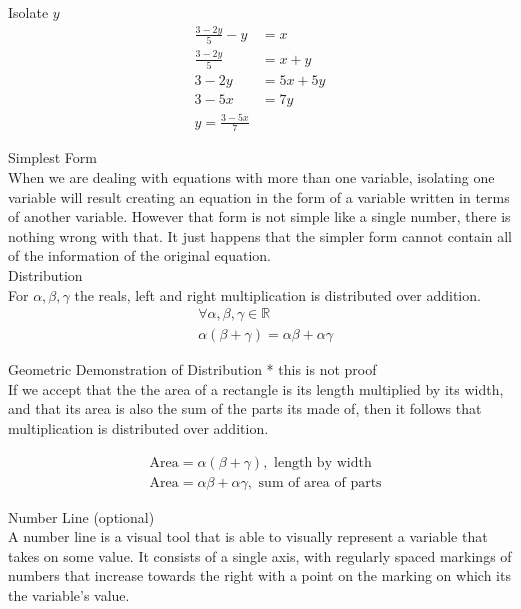 \documentclass{book}
\begin{document}
  {\example Isolate $y$ \\
    \begin{align*}
      \frac{3 - 2y}{5} - y & = x\\
      \frac{3 - 2y}{5} & = x + y\\
      3 - 2y & = 5x + 5y\\
      3 - 5x & = 7y\\
      y = \frac{3 - 5x}{7}
    \end{align*}
  }

  {\remark Simplest Form \\
    When we are dealing with equations with more than one variable, isolating one variable will result creating an equation in the form of a variable written in terms of another variable. However that form is not simple like a single number, there is nothing wrong with that. It just happens that the simpler form cannot contain all of the information of the original equation.
  }\\

  {\axiom Distribution \\
    For $\alpha, \beta, \gamma$ the reals, left and right multiplication is distributed over addition.
    \begin{align*}
      & \forall \alpha, \beta, \gamma \in \mathbb{R}\\
      & \alpha (\beta + \gamma) = \alpha \beta + \alpha \gamma
    \end{align*}
  }

  {\remark Geometric Demonstration of Distribution 
    * this is not proof\\
    If we accept that the the area of a rectangle is its length multiplied by its width, and that its area is also the sum of the parts its made of, then it follows that multiplication is distributed over addition.

    \begin{align*}
      & \text{Area} = \alpha (\beta + \gamma), \text{ length by width}\\
      & \text{Area} = \alpha \beta + \alpha \gamma, \text{ sum of area of parts}
    \end{align*}
  }

  {\remark Number Line (optional) \\
    A number line is a visual tool that is able to visually represent a variable that takes on some value. It consists of a single axis, with regularly spaced markings of numbers that increase towards the right with a point on the marking on which its the variable's value.
  }\\
\end{document}
